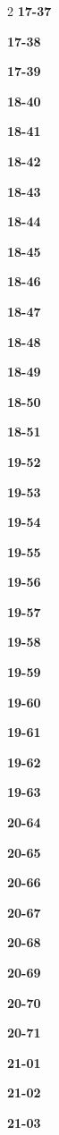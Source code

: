 \documentclass[10pt,a4paper]{article}
\begin{document}
\begin{multicols}{2}
\noindent\textbf{17-37}\ \par
\noindent\textbf{17-38}\ \par
\noindent\textbf{17-39}\ \par
\noindent\textbf{18-40}\ \par
\noindent\textbf{18-41}\ \par
\noindent\textbf{18-42}\ \par
\noindent\textbf{18-43}\ \par
\noindent\textbf{18-44}\ \par
\noindent\textbf{18-45}\ \par
\noindent\textbf{18-46}\ \par
\noindent\textbf{18-47}\ \par
\noindent\textbf{18-48}\ \par
\noindent\textbf{18-49}\ \par
\noindent\textbf{18-50}\ \par
\noindent\textbf{18-51}\ \par
\noindent\textbf{19-52}\ \par
\noindent\textbf{19-53}\ \par
\noindent\textbf{19-54}\ \par
\noindent\textbf{19-55}\ \par
\noindent\textbf{19-56}\ \par
\noindent\textbf{19-57}\ \par
\noindent\textbf{19-58}\ \par
\noindent\textbf{19-59}\ \par
\noindent\textbf{19-60}\ \par
\noindent\textbf{19-61}\ \par
\noindent\textbf{19-62}\ \par
\noindent\textbf{19-63}\ \par
\noindent\textbf{20-64}\ \par
\noindent\textbf{20-65}\ \par
\noindent\textbf{20-66}\ \par
\noindent\textbf{20-67}\ \par
\noindent\textbf{20-68}\ \par
\noindent\textbf{20-69}\ \par
\noindent\textbf{20-70}\ \par
\noindent\textbf{20-71}\ \par
\noindent\textbf{21-01}\ \par
\noindent\textbf{21-02}\ \par
\noindent\textbf{21-03}\ \par

\end{multicols}
\end{document}
